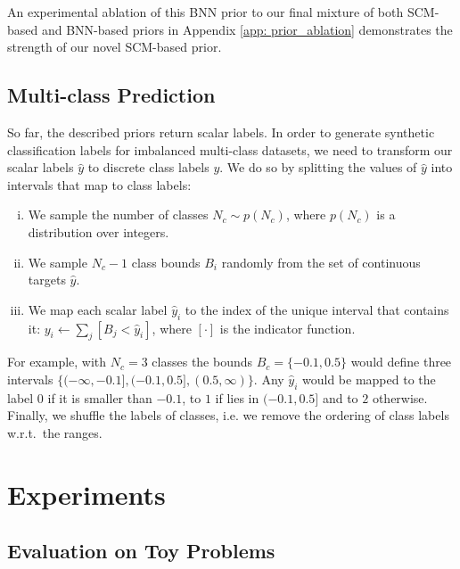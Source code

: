 An experimental ablation of this BNN prior to our final mixture of both SCM-based and BNN-based priors in Appendix \ref{app: prior_ablation} demonstrates the strength of our novel SCM-based prior. 

\subsection{Multi-class Prediction}
\label{sec:multi-class prediction}

So far, the described priors return scalar labels. In order to generate synthetic classification labels for imbalanced multi-class datasets, we need to transform our scalar labels $\hat{y}$ to discrete class labels $y$. We do so by splitting the values of $\hat{y}$ into intervals that map to class labels:
\\

\begin{enumerate}[i), itemsep=-0.1em]
    \item We sample the number of classes $N_c \sim p(N_c)$, where $p(N_c)$ is a distribution over integers.
    \item  We sample $N_c-1$ class bounds $B_{i}$ randomly from the set of continuous targets $\hat{y}$. 
    \item We map each scalar label $\hat{y}_i$ to the index of the unique interval that contains it: $y_i \gets \sum_{j} [B_j < \hat{y}_i]$, where $[\cdot]$ is the indicator function.
\end{enumerate}

For example, with $N_c = 3$ classes the bounds $B_c = \{-0.1, 0.5\}$ would define three intervals $\{(-\infty, -0.1], (-0.1, 0.5], (0.5, \infty)\}$. Any $\hat{y}_i$ would be mapped to the label $0$ if it is smaller than $-0.1$, to $1$ if lies in $(-0.1, 0.5]$ and to $2$ otherwise. Finally, we shuffle the labels of classes, i.e. we remove the ordering of class labels w.r.t.\ the ranges.

\section{Experiments}\label{sec:experiments}

\subsection{Evaluation on Toy Problems}\label{ssec:toyresults}

